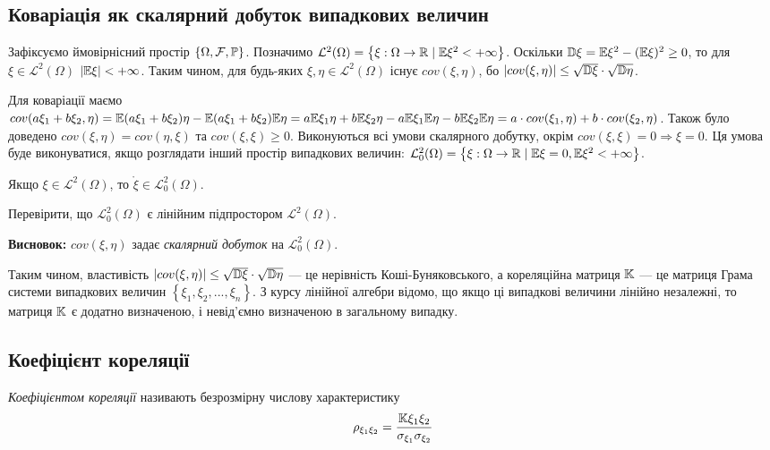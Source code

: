 \subsection{Коваріація як скалярний добуток випадкових величин}
Зафіксуємо ймовірнісний простір $\left\{\Omega, \mathcal{F}, \P\right\}$.
Позначимо $\mathcal{L}^2(\Omega) = \left\{\xi : \Omega \rightarrow \mathbb{R} \;|\; \E\xi^2 < +\infty\right\}$.
Оскільки $\D\xi = \E\xi^2 - (\E\xi)^2 \geq 0$, то для $\xi \in \mathcal{L}^2(\Omega)$ $|\E\xi| < +\infty$.
Таким чином, для будь-яких $\xi, \eta \in \mathcal{L}^2(\Omega)$ 
існує ${cov}(\xi,\eta)$, бо $|{cov}(\xi,\eta)| \leq \sqrt{\D\xi} \cdot \sqrt{\D\eta}$.

Для коваріації маємо 
${cov}(a\xi_1 + b\xi_2,\eta) = \E(a\xi_1+b\xi_2)\eta - \E(a\xi_1 + b\xi_2)\E\eta = 
a \E\xi_1\eta + b \E\xi_2\eta - a \E\xi_1 \E\eta - b \E\xi_2 \E\eta = a\cdot{cov}(\xi_1,\eta) + b\cdot{cov}(\xi_2,\eta)$.
Також було доведено ${cov}(\xi, \eta) = {cov}(\eta, \xi)$ та ${cov}(\xi, \xi) \geq 0$.
Виконуються всі умови скалярного добутку, окрім ${cov}(\xi, \xi) = 0 \Rightarrow \xi = 0$.
Ця умова буде виконуватися, якщо розглядати інший простір випадкових величин:
$\mathcal{L}_0^2(\Omega) = \left\{\xi : \Omega \rightarrow \mathbb{R} \;|\; \E\xi = 0, \E\xi^2 < +\infty\right\}$.
\begin{remark}
    Якщо $\xi \in \mathcal{L}^2(\Omega)$, то $\mathring{\xi} \in \mathcal{L}_0^2(\Omega)$.
\end{remark}
\begin{exercise}
    Перевірити, що $\mathcal{L}_0^2(\Omega)$ є лінійним підпростором $\mathcal{L}^2(\Omega)$.
\end{exercise}

\noindent \textbf{Висновок:} ${cov}(\xi, \eta)$ задає \emph{скалярний добуток} на $\mathcal{L}_0^2(\Omega)$.

\vspace{0.5em}
Таким чином, властивість $|{cov}(\xi,\eta)| \leq \sqrt{\D\xi} \cdot \sqrt{\D\eta}$ ---
це нерівність Коші-Буняковського, а кореляційна матриця $\K$ --- це матриця Грама системи
випадкових величин $\left\{\xi_1, \xi_2, ..., \xi_n\right\}$.
З курсу лінійної алгебри відомо, що якщо ці випадкові величини лінійно незалежні, то матриця $\K$ є додатно визначеною, 
і невід'ємно визначеною в загальному випадку.

\subsection{Коефіцієнт кореляції}
\begin{definition}
    \emph{Коефіцієнтом кореляції} називають безрозмірну числову характеристику
    \begin{equation*}
        \rho_{\xi_1\xi_2} = \frac{\K\xi_1\xi_2}{\sigma_{\xi_1}\sigma_{\xi_2}}
    \end{equation*}
\end{definition}


